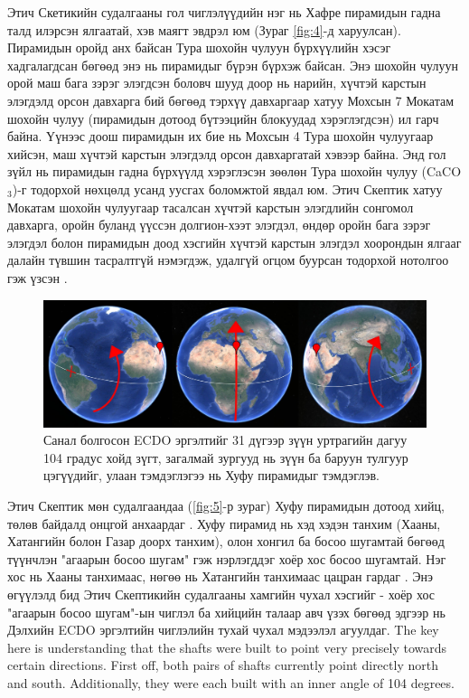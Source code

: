 \documentclass[10pt,twocolumn,letterpaper]{article}
\begin{document}
Этич Скетикийн судалгааны гол чиглэлүүдийн нэг нь Хафре пирамидын гадна талд илэрсэн ялгаатай, хэв маягт эвдрэл юм (Зураг \ref{fig:4}-д харуулсан). Пирамидын оройд анх байсан Тура шохойн чулуун бүрхүүлийн хэсэг хадгалагдсан бөгөөд энэ нь пирамидыг бүрэн бүрхэж байсан. Энэ шохойн чулуун орой маш бага зэрэг элэгдсэн боловч шууд доор нь нарийн, хүчтэй карстын элэгдэлд орсон давхарга бий бөгөөд тэрхүү давхаргаар хатуу Мохсын 7 Мокатам шохойн чулуу (пирамидын дотоод бүтээцийн блокуудад хэрэглэгдсэн) ил гарч байна. Үүнээс доош пирамидын их бие нь Мохсын 4 Тура шохойн чулуугаар хийсэн, маш хүчтэй карстын элэгдэлд орсон давхаргатай хэвээр байна. Энд гол зүйл нь пирамидын гадна бүрхүүлд хэрэглэсэн зөөлөн Тура шохойн чулуу (CaCO$_3$)-г тодорхой нөхцөлд усанд уусгах боломжтой явдал юм. Этич Скептик хатуу Мокатам шохойн чулуугаар тасалсан хүчтэй карстын элэгдлийн сонгомол давхарга, оройн буланд үүссэн долгион-хээт элэгдэл, өндөр оройн бага зэрэг элэгдэл болон пирамидын доод хэсгийн хүчтэй карстын элэгдэл хоорондын ялгааг далайн түвшин тасралтгүй нэмэгдэж, удалгүй огцом буурсан тодорхой нотолгоо гэж үзсэн \cite{27}.

\begin{figure}[b]
\begin{center}
\includegraphics[width=1\textwidth]{drawing.jpg}
\end{center}
   \caption{Санал болгосон ECDO эргэлтийг 31 дүгээр зүүн уртрагийн дагуу 104 градус хойд зүгт, загалмай зургууд нь зүүн ба баруун тулгуур цэгүүдийг, улаан тэмдэглэгээ нь Хуфу пирамидыг тэмдэглэв.}
\label{fig:6}
\end{figure}

Этич Скептик мөн судалгаандаа (\ref{fig:5}-р зураг) Хуфу пирамидын дотоод хийц, төлөв байдалд онцгой анхаардаг \cite{28}. Хуфу пирамид нь хэд хэдэн танхим (Хааны, Хатангийн болон Газар доорх танхим), олон хонгил ба босоо шугамтай бөгөөд түүнчлэн "агаарын босоо шугам" гэж нэрлэгддэг хоёр хос босоо шугамтай. Нэг хос нь Хааны танхимаас, нөгөө нь Хатангийн танхимаас цацран гардаг \cite{29,30}. Энэ өгүүлэлд бид Этич Скептикийн судалгааны хамгийн чухал хэсгийг - хоёр хос "агаарын босоо шугам"-ын чиглэл ба хийцийн талаар авч үзэх бөгөөд эдгээр нь Дэлхийн ECDO эргэлтийн чиглэлийн тухай чухал мэдээлэл агуулдаг.
The key here is understanding that the shafts were built to point very precisely towards certain directions. First off, both pairs of shafts currently point directly north and south. Additionally, they were each built with an inner angle of 104 degrees.
\end{document}
